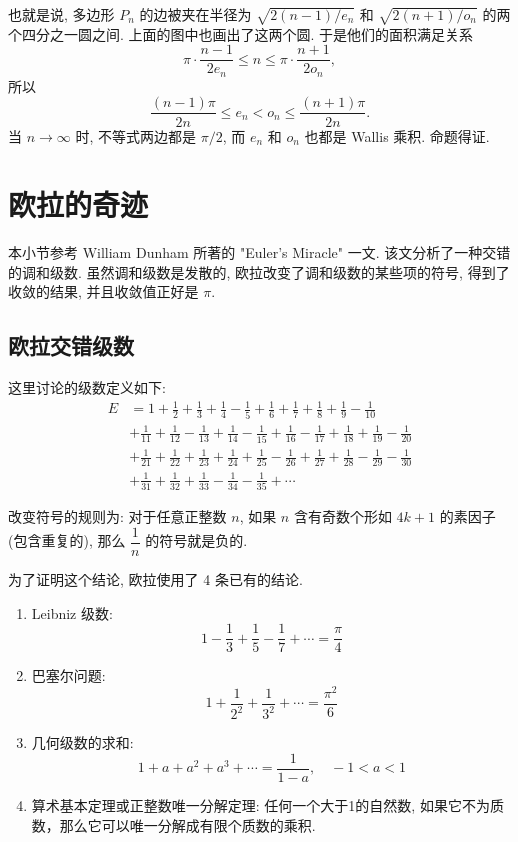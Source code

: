 也就是说, 多边形 $ P_n $ 的边被夹在半径为 $ \sqrt{2(n-1)/e_n} $ 和 $ \sqrt{2(n+1)/o_n} $ 的两个四分之一圆之间. 上面的图中也画出了这两个圆. 于是他们的面积满足关系
\[ \pi\cdot\frac{n-1}{2e_n} \le n \le \pi\cdot\frac{n+1}{2o_n} ,\]
所以 \[ \frac{(n-1)\pi}{2n} \le e_n < o_n \le \frac{(n+1)\pi}{2n} .\]
当 $ n  \rightarrow  \infty $ 时, 不等式两边都是 $ \pi/2 $, 而 $ e_n $ 和 $ o_n $ 也都是 Wallis 乘积. 命题得证.

\newpage
\section{欧拉的奇迹}
本小节参考 William Dunham 所著的 "Euler's Miracle" 一文. 该文分析了一种交错的调和级数.
虽然调和级数是发散的, 欧拉改变了调和级数的某些项的符号, 得到了收敛的结果, 并且收敛值正好是 $ \pi $.

\subsection{欧拉交错级数}

这里讨论的级数定义如下:
\begin{align*}
E &= 1 + \frac{1}{2} + \frac{1}{3} + \frac{1}{4} - \frac{1}{5} + \frac{1}{6} + \frac{1}{7} + \frac{1}{8} + \frac{1}{9} - \frac{1}{10} \\ 
& + \frac{1}{11} + \frac{1}{12} - \frac{1}{13} + \frac{1}{14} - \frac{1}{15} + \frac{1}{16} - \frac{1}{17} + \frac{1}{18} + \frac{1}{19} - \frac{1}{20} \\
& + \frac{1}{21} + \frac{1}{22} + \frac{1}{23} + \frac{1}{24} + \frac{1}{25} - \frac{1}{26} + \frac{1}{27} + \frac{1}{28} - \frac{1}{29} - \frac{1}{30} \\
& + \frac{1}{31} + \frac{1}{32} + \frac{1}{33} - \frac{1}{34} - \frac{1}{35} + \cdots
\end{align*}

改变符号的规则为: 对于任意正整数 $ n $, 如果 $n$ 含有奇数个形如 $ 4k + 1$ 的素因子(包含重复的), 那么 $\dfrac{1}{n} $ 的符号就是负的.

为了证明这个结论, 欧拉使用了 4 条已有的结论. 

\begin{enumerate}
\item Leibniz 级数: 
\[ 1-\frac{1}{3}+\frac{1}{5}-\frac{1}{7} + \cdots =\frac{\pi}{4} \]
\item 巴塞尔问题: 
\[ 1+\frac{1}{2^2}+\frac{1}{3^2}+\cdots = \frac{\pi^2}{6} \]
\item 几何级数的求和:
\[ 1 + a + a^2 + a^3 + \cdots = \frac{1}{1-a}, \quad -1 < a < 1 \]
\item 算术基本定理或正整数唯一分解定理: 任何一个大于1的自然数, 如果它不为质数，那么它可以唯一分解成有限个质数的乘积.
\end{enumerate}

